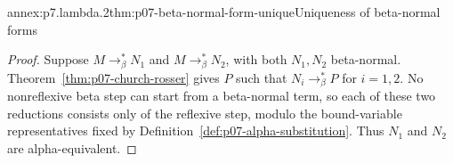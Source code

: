 \begin{annexitem}{annex:p7.lambda.2}{thm:p07-beta-normal-form-unique}{Uniqueness of beta-normal forms}
\begin{proof}
Suppose
\(M\longrightarrow_{\beta}^{*}N_1\) and
\(M\longrightarrow_{\beta}^{*}N_2\), with both \(N_1,N_2\) beta-normal.
Theorem~\ref{thm:p07-church-rosser} gives \(P\) such that
\(N_i\longrightarrow_{\beta}^{*}P\) for \(i=1,2\).  No nonreflexive beta step
can start from a beta-normal term, so each of these two reductions consists
only of the reflexive step, modulo the bound-variable representatives fixed
by Definition~\ref{def:p07-alpha-substitution}.  Thus \(N_1\) and \(N_2\) are
alpha-equivalent.
\end{proof}
\end{annexitem}
